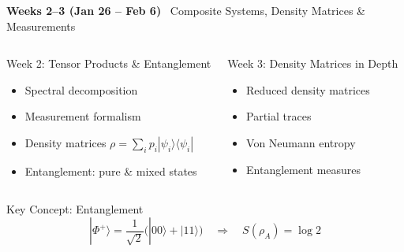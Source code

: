 \documentclass[aspectratio=169,12pt]{beamer}
\newcommand{\ket}[1]{|#1\rangle}
\newcommand{\bra}[1]{\langle#1|}
\newcommand{\week}[1]{\textcolor{qgold}{\textbf{#1}}}
\begin{document}
\begin{frame}{\week{Weeks 2--3 (Jan 26 -- Feb 6)} \ Composite Systems, Density Matrices \& Measurements}
  \begin{columns}[T]
      \begin{block}{Week 2: Tensor Products \& Entanglement}
        \begin{itemize}
          \item Spectral decomposition
          \item Measurement formalism
          \item Density matrices $\rho = \sum_i p_i \ket{\psi_i}\bra{\psi_i}$
          \item Entanglement: pure \& mixed states
        \end{itemize}
      \end{block}
      \begin{block}{Week 3: Density Matrices in Depth}
        \begin{itemize}
          \item Reduced density matrices
          \item Partial traces
          \item Von Neumann entropy
          \item Entanglement measures
        \end{itemize}
      \end{block}
  \end{columns}
  \vspace{6pt}
  \begin{block}{Key Concept: Entanglement}
    \[
      \ket{\Phi^+} = \frac{1}{\sqrt{2}}\bigl(\ket{00}+\ket{11}\bigr)
      \quad\Rightarrow\quad S(\rho_A) = \log 2
    \]
  \end{block}
\end{frame}
\end{document}
